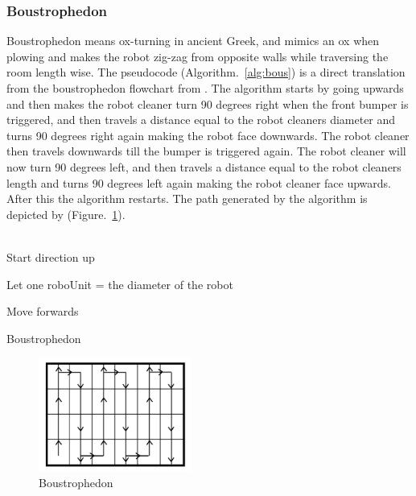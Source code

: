 \documentclass[bachelor]{kththesis}
\begin{document}
\subsubsection{Boustrophedon}
Boustrophedon means ox-turning in ancient Greek, and mimics an ox when plowing and makes the robot zig-zag from opposite walls while traversing the room length wise\parencite{choset}\parencite{rekl}. The pseudocode (Algorithm.~\ref{alg:bous}) is a direct translation from the boustrophedon flowchart from \textcite{hasan}. The algorithm starts by going upwards and then makes the robot cleaner turn 90 degrees right 
when the front bumper is triggered, and then travels a distance equal to the robot cleaners diameter 
and turns 90 degrees right again making the robot face downwards. The robot cleaner then travels downwards till the bumper is 
triggered again. The robot cleaner will now turn 90 degrees left,
and then travels a distance equal to the robot cleaners length and turns 90 degrees left again making the robot cleaner face upwards. After this the algorithm restarts. The path generated by the algorithm is depicted by (Figure.~\ref{fig:2}).
\\\\
\begin{algorithm}[H]
	\SetAlgoLined
	Start direction up
	
	Let one roboUnit = the diameter of the robot
	
	{
		Move forwards
	}	
	\caption{Boustrophedon \parencite{hasan}}
	\label{alg:bous}

\end{algorithm}


\begin{figure}[H]
	\includegraphics[width=5cm]{img/bous.png}
	\centering
	\caption{Boustrophedon}
	\label{fig:2}
\end{figure}
\end{document}
